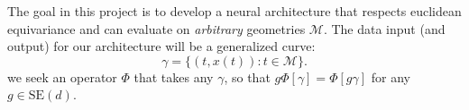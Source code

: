 \documentclass{article}
\newtheorem{note}{Setting}
\newcommand{\manifold}{\mathcal{M}}
\newcommand{\dif}[1]{\mathrm{d}#1}
\newcommand{\euclid}[1]{\mathrm{SE}(#1)}
\begin{document}
    The goal in this project is to develop a neural architecture that respects euclidean equivariance and can evaluate on \emph{arbitrary} geometries $\manifold$. The data input (and output) for our architecture will be a generalized curve:
    \[
        \gamma = \{(t, x(t))\colon t\in\manifold\}.
    \] 
    we seek an operator $\Phi$ that takes any $\gamma$, so that $g\Phi[\gamma] = \Phi[g\gamma]$ for any $g\in \euclid{d}$. 
    
    

\end{document}

